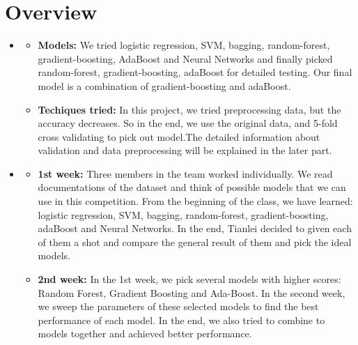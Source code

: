 \section{Overview}
\medskip
\begin{itemize}

    \item {}
    \begin{itemize}
    \item \textbf{Models:} We tried logistic regression, SVM, bagging, random-forest, gradient-boosting, AdaBoost and Neural Networks and finally picked  random-forest, gradient-boosting, adaBoost for detailed testing. Our final model is a combination of gradient-boosting and adaBoost.
    \item \textbf{Techiques tried:} In this project, we tried preprocessing data, but the accuracy decreases. So in the end, we use the original data, and 5-fold cross validating to pick out model.The detailed information about validation and data preprocessing will be explained in the later part.
    \end{itemize}

    \item {}
    \begin{itemize}
    \item \textbf{1st week:} Three members in the team worked individually. We read documentations of the dataset and think of possible models that we can use in this competition. From the beginning of the class, we have learned: logistic regression, SVM, bagging, random-forest, gradient-boosting, adaBoost and Neural Networks. In the end, Tianlei decided to given each of them a shot and compare the general result of them and pick the ideal models.
    \item \textbf{2nd week:} In the 1st week, we pick several models with higher scores: Random Forest, Gradient Boosting and Ada-Boost. In the second week, we sweep the parameters of these selected models to find the best performance of each model. In the end, we also tried to combine to models together and achieved better performance.
    \end{itemize}

\end{itemize}



